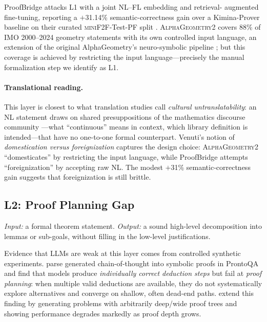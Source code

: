 \documentclass[11pt,letterpaper]{article}
\begin{document}
ProofBridge attacks L1 with a joint NL--FL embedding and retrieval-
augmented fine-tuning, reporting a $+$31.14\% semantic-correctness gain
over a Kimina-Prover baseline on their curated \textsc{miniF2F}-Test-PF
split \cite{jana2025proofbridge}. \textsc{AlphaGeometry2}
\cite{chervonyi2025alphageometry2} covers 88\% of IMO 2000--2024
geometry statements with its own controlled input language, an
extension of the original AlphaGeometry's neuro-symbolic pipeline
\cite{trinh2023alphageometry}; but this coverage is achieved by
restricting the input language---precisely the manual formalization
step we identify as L1.

\paragraph{Translational reading.}
This layer is closest to what translation studies call \emph{cultural
untranslatability}: an NL statement draws on shared presuppositions of
the mathematics discourse community \cite{swales1990genre}---what
``continuous'' means in context, which library definition is
intended---that have no one-to-one formal counterpart. Venuti's
notion of \emph{domestication versus foreignization}
\cite{venuti1995invisibility} captures the design choice:
\textsc{AlphaGeometry2} ``domesticates'' by restricting the input
language, while ProofBridge attempts ``foreignization'' by accepting
raw NL. The modest $+$31\% semantic-correctness gain suggests that
foreignization is still brittle.

\subsection{L2: Proof Planning Gap}
\label{sec:l2}

\emph{Input:} a formal theorem statement. \emph{Output:} a sound
high-level decomposition into lemmas or sub-goals, without filling in
the low-level justifications.

Evidence that LLMs are weak at this layer comes from controlled
synthetic experiments. \citet{saparov2023prontoqa} parse generated
chain-of-thought into symbolic proofs in ProntoQA and find that models
produce \emph{individually correct deduction steps} but fail at
\emph{proof planning}: when multiple valid deductions are available,
they do not systematically explore alternatives and converge on
shallow, often dead-end paths. \citet{opedal2024mathgap} extend this
finding by generating problems with arbitrarily deep/wide proof trees
and showing performance degrades markedly as proof depth grows.
\end{document}

